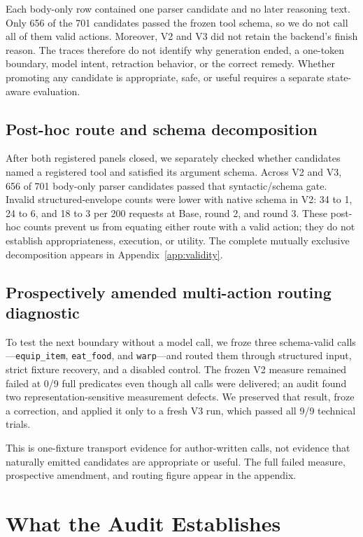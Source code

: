 \documentclass[10pt]{article}
\begin{document}
Each body-only row contained one parser candidate and no later reasoning text.
Only 656 of the 701 candidates passed the frozen tool schema, so we do not call
all of them valid actions. Moreover, V2 and V3 did not retain the backend's
finish reason. The traces therefore do not identify why generation ended, a
one-token boundary, model intent, retraction behavior, or the correct remedy.
Whether promoting any candidate is appropriate, safe, or useful requires a
separate state-aware evaluation.

\subsection{Post-hoc route and schema decomposition}

After both registered panels closed, we separately checked whether candidates
named a registered tool and satisfied its argument schema. Across V2 and V3,
656 of 701 body-only parser candidates passed that syntactic/schema gate.
Invalid structured-envelope counts were lower with native schema in V2: 34 to
1, 24 to 6, and 18 to 3 per 200 requests at Base, round 2, and round 3.
These post-hoc counts prevent us from equating either route with a valid action;
they do not establish appropriateness, execution, or utility. The complete
mutually exclusive decomposition appears in Appendix~\ref{app:validity}.

\subsection{Prospectively amended multi-action routing diagnostic}

To test the next boundary without a model call, we froze three schema-valid
calls---\texttt{equip\_item}, \texttt{eat\_food}, and \texttt{warp}---and
routed them through structured input, strict fixture recovery, and a disabled
control. The frozen V2 measure remained failed at 0/9 full predicates even
though all calls were delivered; an audit found two representation-sensitive
measurement defects. We preserved that result, froze a correction, and applied
it only to a fresh V3 run, which passed all 9/9 technical trials.

This is one-fixture transport evidence for author-written calls, not evidence
that naturally emitted candidates are appropriate or useful. The full failed
measure, prospective amendment, and routing figure appear in the appendix.

\section{What the Audit Establishes}
\end{document}

